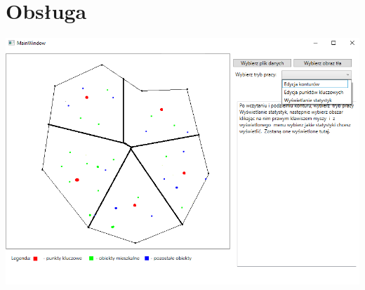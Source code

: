 \documentclass[a4paper,11pt]{article}
\begin{document}
\section{Obsługa}
\includegraphics[scale=0.75]{GUI_EXAMPLE.png}
\end{document}

